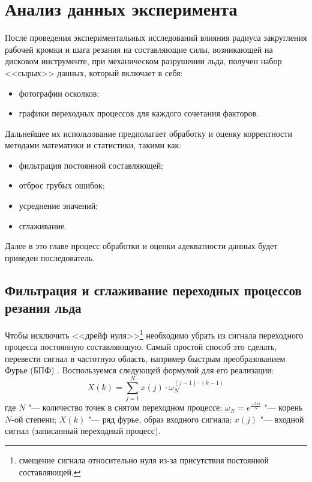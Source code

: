 \chapter{Анализ данных эксперимента}\label{chapt3}

После проведения экспериментальных исследований влияния радиуса закругления рабочей кромки и шага резания на составляющие силы, возникающей на дисковом инструменте, при механическом разрушении льда, получен набор <<сырых>> данных, который включает в себя:
\begin{itemize}
	\item фотографии осколков;
	\item графики переходных процессов для каждого сочетания факторов.
\end{itemize}

Дальнейшее их использование предполагает обработку и оценку корректности методами математики и статистики, такими как:
\begin{itemize}
	\item фильтрация постоянной составляющей;
	\item отброс грубых ошибок;
	\item усреднение значений;	
	\item сглаживание.
\end{itemize}

Далее в это главе процесс обработки и оценки адекватности данных будет приведен последователь.

\section{Фильтрация и сглаживание переходных процессов резания льда}\label{sect3_1}

Чтобы исключить <<дрейф нуля>>\footnote{смещение сигнала относительно нуля из-за присутствия постоянной составляющей.} необходимо убрать из сигнала переходного процесса постоянную составляющую. Самый простой способ это сделать, перевести сигнал в частотную область, например быстрым преобразованием Фурье (БПФ) \cite{BPF,BPFEng}. Воспользуемся следующей формулой для его реализации:
\begin{equation}\label{eq:FFT}
X(k)=\sum_{j=1}^{N} x(j)\cdot\omega_{N}^{(j-1)\cdot(k-1)}
\end{equation}
где $ N $ "--- количество точек в снятом переходном процессе; $ \omega_{N} = e^{\frac{-2\pi i}{N}} $ "--- корень $ N $-ой степени; $ X(k) $ "--- ряд фурье, образ входного сигнала; $ x(j) $ "--- входной сигнал (записанный переходный процесс).

